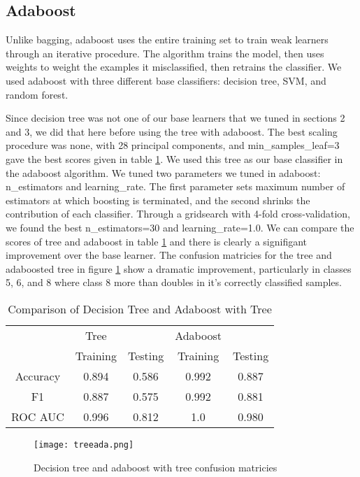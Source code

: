 \documentclass[12pt]{article}
\begin{document}
\subsection{Adaboost}

Unlike bagging, adaboost uses the entire training set to train weak learners through an iterative procedure. The algorithm trains the model, then uses weights to weight the examples it misclassified, then retrains the classifier. We used adaboost with three different base classifiers: decision tree, SVM, and random forest.

Since decision tree was not one of our base learners that we tuned in sections 2 and 3, we did that here before using the tree with adaboost. The best scaling procedure was none, with 28 principal components, and min\_samples\_leaf=3 gave the best scores given in table \ref{table: 12}. We used this tree as our base classifier in the adaboost algorithm. We tuned two parameters we tuned in adaboost: n\_estimators and learning\_rate. The first parameter sets maximum number of estimators at which boosting is terminated, and the second shrinks the contribution of each classifier. Through a gridsearch with 4-fold cross-validation, we found the best n\_estimators=30 and learning\_rate=1.0. We can compare the scores of tree and adaboost in table \ref{table: 12} and there is clearly a signifigant improvement over the base learner. The confusion matricies for the tree and adaboosted tree in figure \ref{treeconf} show a dramatic improvement, particularly in classes 5, 6, and 8 where class 8 more than doubles in it's correctly classified samples.

\begin{table}[h!]
	\centering
	\begin{tabular}{| c|cc|cc|} 
		\hline
		&Tree&&Adaboost&\\
		& Training & Testing& Training & Testing\\ \hline
		Accuracy & 0.894& 0.586 & 0.992 &0.887 \\ 
		F1  &  0.887 &0.575&  0.992 &0.881\\ 
		ROC AUC & 0.996 & 0.812 & 1.0 &0.980\\
		\hline
	\end{tabular}
	\caption{Comparison of Decision Tree and Adaboost with Tree}
	\label{table: 12}
\end{table}
\begin{figure}[h]
	\centering
	\texttt{[image: treeada.png]}
	\caption{Decision tree and adaboost with tree confusion matricies}
	\label{treeconf}
\end{figure}
\end{document}
